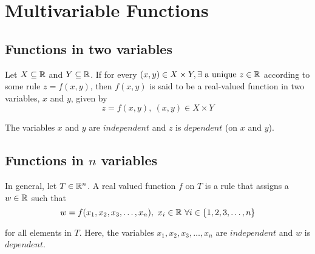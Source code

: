 \section{Multivariable Functions}

\subsection{Functions in two variables}
Let $X \subseteq \mathbb{R}$ and $Y \subseteq \mathbb{R}$. If for every $(x, y) \in X \times Y, \exists \text{ a unique } z \in \mathbb{R}$
according to some rule $z = f(x, y)$, then $f(x, y)$ is said to be a real-valued function in two variables, $x$ and $y$, given by
\begin{equation}
    z = f(x, y),\ (x, y) \in X \times Y
\end{equation}

The variables $x$ and $y$ are $independent$ and $z$ is $dependent$ (on $x$ and $y$).


\subsection{Functions in \texorpdfstring{$n$}{n} variables}
In general, let $T \in \mathbb{R}^n$. A real valued function $f$ on $T$ is a rule that assigns a $w \in \mathbb{R}$ such that
\begin{equation}
    w = f(x_1, x_2, x_3, \hdots, x_n),\ x_i \in \mathbb{R}\ \forall i \in \{1, 2, 3, \hdots, n\}
\end{equation}

for all elements in $T$. Here, the variables $x_1, x_2, x_3, \hdots, x_n$ are $independent$ and $w$ is $dependent$.